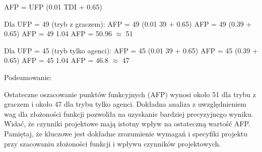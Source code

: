 \documentclass[12pt,a4paper]{article}
\begin{document}
AFP = UFP  (0.01  TDI + 0.65)

   Dla UFP = 49 (tryb z graczem):
    AFP = 49  (0.01  39 + 0.65)
    AFP = 49  (0.39 + 0.65)
    AFP = 49  1.04
    AFP = 50.96 $\approx$ 51

   Dla UFP = 45 (tryb tylko agenci):
    AFP = 45  (0.01  39 + 0.65)
    AFP = 45  (0.39 + 0.65)
    AFP = 45  1.04
    AFP = 46.8 $\approx$ 47

Podsumowanie:

Ostateczne oszacowanie punktów funkcyjnych (AFP) wynosi około 51 dla trybu z graczem i około 47 dla trybu tylko agenci. Dokładna analiza z uwzględnieniem wag dla złożoności funkcji pozwoliła na uzyskanie bardziej precyzyjnego wyniku. Widać, że czynniki projektowe mają istotny wpływ na ostateczną wartość AFP. Pamiętaj, że kluczowe jest dokładne zrozumienie wymagań i specyfiki projektu przy szacowaniu złożoności funkcji i wpływu czynników projektowych.

	
\end{document}
